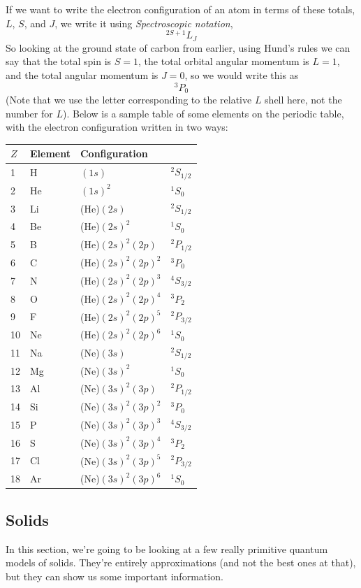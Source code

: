 \documentclass[a4paper]{article}
\begin{document}
If we want to write the electron configuration of an atom in terms of these
totals, $L$, $S$, and $J$, we write it using \emph{Spectroscopic notation},
\[ ^{2S+1}L_J \]
So looking at the ground state of carbon from earlier, using Hund's rules we
can say that the total spin is $S=1$, the total orbital angular momentum is
$L=1$, and the total angular momentum is $J=0$, so we would write this as
\[ ^3P_0 \]
(Note that we use the letter corresponding to the relative $L$ shell here, not
the number for $L$). Below is a sample table of some elements on the periodic
table, with the electron configuration written in two ways:

\begin{center}
\begin{tabular}{l l l l}
	\toprule
	$Z$ & Element & Configuration\\
	\midrule
	1	& H	& $(1s)$		& $^2S_{1/2}$\\
	2	& He	& $(1s)^2$		& $^1S_0$\\
	\midrule
	3	& Li	& (He)$(2s)$		& $^2S_{1/2}$\\
	4	& Be	& (He)$(2s)^2$		& $^1S_0$\\
	5	& B	& (He)$(2s)^2(2p)$	& $^2P_{1/2}$\\
	6	& C	& (He)$(2s)^2(2p)^2$	& $^3P_{0}$\\
	7	& N	& (He)$(2s)^2(2p)^3$	& $^4S_{3/2}$\\
	8	& O	& (He)$(2s)^2(2p)^4$	& $^3P_{2}$\\
	9	& F	& (He)$(2s)^2(2p)^5$	& $^2P_{3/2}$\\
	10	& Ne	& (He)$(2s)^2(2p)^6$	& $^1S_0$\\
	\midrule
	11	& Na	& (Ne)$(3s)$		& $^2S_{1/2}$\\
	12	& Mg	& (Ne)$(3s)^2$		& $^1S_0$\\
	13	& Al	& (Ne)$(3s)^2(3p)$	& $^2P_{1/2}$\\
	14	& Si	& (Ne)$(3s)^2(3p)^2$	& $^3P_0$\\
	15	& P	& (Ne)$(3s)^2(3p)^3$	& $^4S_{3/2}$\\
	16	& S	& (Ne)$(3s)^2(3p)^4$	& $^3P_2$\\
	17	& Cl	& (Ne)$(3s)^2(3p)^5$	& $^2P_{3/2}$\\
	18	& Ar	& (Ne)$(3s)^2(3p)^6$	& $^1S_{0}$\\
	\bottomrule
\end{tabular}
\end{center}

\subsection{Solids}
In this section, we're going to be looking at a few really primitive quantum
models of solids. They're entirely approximations (and not the best ones at
that), but they can show us some important information.
\end{document}
